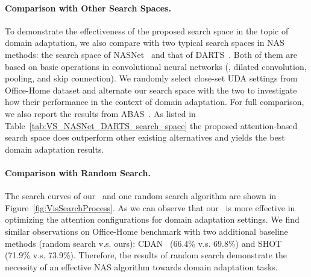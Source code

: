 \documentclass[10pt,twocolumn,letterpaper]{article}
\begin{document}
\begin{table}
    \centering
    \caption{Comparison of the proposed search space and two existing typical ones. The Experiments are conducted on the four closed-set UDA settings on Office-Home dataset.}
    \label{tab:VS_NASNet_DARTS_search_space}
    \small{
    }
    \vspace{-2mm}
\end{table} 
\paragraph{Comparison with Other Search Spaces.}
To demonstrate the effectiveness of the proposed search space in the topic of domain adaptation, we also compare with two typical search spaces in NAS methods: the search space of NASNet~\cite{zoph2018NASNet} and that of DARTS~\cite{liu2018DARTS}. Both of them are based on basic operations in convolutional neural networks (\eg, dilated convolution, pooling, and skip connection). We randomly select  close-set UDA settings from Office-Home dataset and alternate our search space with the two to investigate how their performance in the context of domain adaptation.
For full comparison, we also report the results from ABAS~\cite{robbiano2021adversarial}.
As listed in Table~\ref{tab:VS_NASNet_DARTS_search_space} the proposed attention-based search space does outperform other existing alternatives and yields the best domain adaptation results.

\vspace{-2mm}
\paragraph{Comparison with Random Search.}
The search curves of our \iMethod\, and one random search algorithm are shown in Figure~\ref{fig:VisSearchProcess}.
As we can observe that our \iMethod\, is more effective in optimizing the attention configurations for domain adaptation settings.
We find similar observations on Office-Home benchmark with two additional baseline methods (random search v.s. ours): CDAN~\cite{long2018CDAN} (66.4\% v.s. 69.8\%) and SHOT~\cite{liang2020shot} (71.9\% v.s. 73.9\%).
Therefore, the results of random search demonstrate the necessity of an effective NAS algorithm towards domain adaptation tasks.
\end{document}
